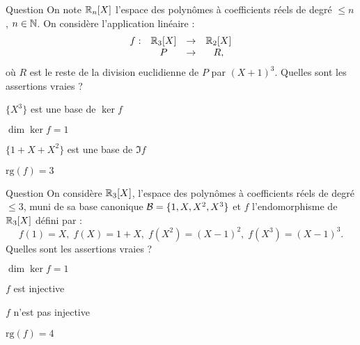 \begin{multi}[multiple,feedback=
{\(\ker f=\{P \in \Rr_3[X] \; ; \; R=0\}=\{(X+1)^3Q \; ; \; Q\in\Rr\}\). Donc \(\{(1+X)^3\}\) est une base de \(\ker f\). D'après le théorème du rang, \(\mbox{rg}(f)=\dim \Im f=3\) et l'on vérifie que \(\{1,X,X^2\}\) est une base de \(\Im f\). 
}]{Question}
On note \(\mathbb{R}_n[X]\) l'espace des polynômes à coefficients réels de degré \(\le n\), \(n\in \mathbb{N}\). On considère l'application linéaire : 
\[\begin{array}{rccc}f:&\mathbb{R}_3[X]&\to&\mathbb{R}_2[X]\\
& P&\to & R,  \end{array}\]
où \(R\) est le reste de la division euclidienne de \(P\) par \((X+1)^3\). Quelles sont les assertions vraies ?

    \item \(\{X^3\}\) est une base de \(\ker f \)
    \item* \(\dim \ker f =1\)
    \item \(\{1+X+X^2\}\) est une base de \(\Im f \)
    \item \(\mbox{rg} (f) =3\)
\end{multi}


\begin{multi}[multiple,feedback=
{Soit \(P= aX^3+bX^2+cX+d,\, a,b,c,d \in \Rr \). On a :
\[P\in \ker f\Leftrightarrow a(X-1)^3+b(X-1)^2+(c+d)(X-1)+2c+d=0.\] Comme \(\{1,X-1,(X-1)^2,(X-1)^3\}\) est une famille libre, on déduit que \(P=0\). Donc \(\dim \ker f=0\) et \(f\) est injective.
\vskip0mm
D'après le théorème du rang, \(\mbox{rg}(f)=\dim \Im f=4\) et comme \(\Im f\) est un sous-espace vectoriel de \(\Rr_3[X]\), \(\Im f=\Rr_3[X]\) et donc \(f\) est surjective.
}]{Question}
On considère \(\Rr_3[X]\), l'espace des polynômes à coefficients réels de degré \(\le 3\), muni de sa base canonique \({\cal{ B}}= \{1,X,X^2,X^3\} \) et \(f\) l'endomorphisme de \(\Rr_3[X]\)
défini par :
\[f(1)=X,\;  f(X)=1+X,\; f(X^2)= (X-1)^2,\; f(X^3)=(X-1)^3.\]
Quelles sont les assertions vraies ?

    \item \(\dim \ker f =1\)
    \item* \(f\) est injective
    \item \(f\) n'est pas injective
    \item* \(\mbox{rg} (f)=4\)
\end{multi}


